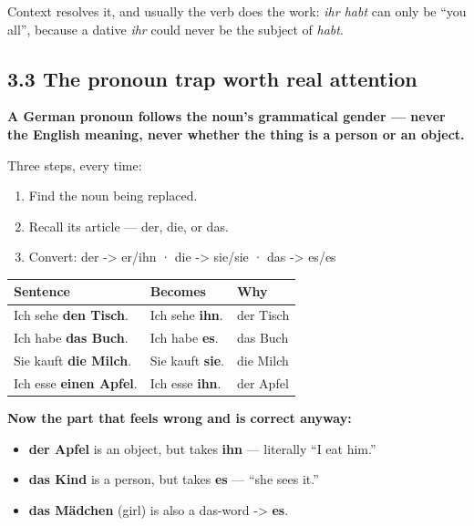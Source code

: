 \documentclass[
  11pt,
]{article}
\newcounter{none} %
\providecommand{\tightlist}{%
  \setlength{\itemsep}{0pt}\setlength{\parskip}{0pt}}
\begin{document}
Context resolves it, and usually the verb does the work: \emph{ihr habt}
can only be ``you all'', because a dative \emph{ihr} could never be the
subject of \emph{habt}.

\subsection{3.3 The pronoun trap worth real
attention}\label{the-pronoun-trap-worth-real-attention}

\textbf{A German pronoun follows the noun's grammatical gender --- never
the English meaning, never whether the thing is a person or an object.}

Three steps, every time:

\begin{enumerate}
\def\labelenumi{\arabic{enumi}.}
\tightlist
\item
  Find the noun being replaced.
\item
  Recall its article --- der, die, or das.
\item
  Convert: der -\textgreater{} er/ihn · die -\textgreater{} sie/sie ·
  das -\textgreater{} es/es
\end{enumerate}

{\def\LTcaptype{none} %
\begin{longtable}[]{@{}lll@{}}
\toprule\noalign{}
Sentence & Becomes & Why \\
\midrule\noalign{}
\endhead
\bottomrule\noalign{}
\endlastfoot
Ich sehe \textbf{den Tisch}. & Ich sehe \textbf{ihn}. & der Tisch \\
Ich habe \textbf{das Buch}. & Ich habe \textbf{es}. & das Buch \\
Sie kauft \textbf{die Milch}. & Sie kauft \textbf{sie}. & die Milch \\
Ich esse \textbf{einen Apfel}. & Ich esse \textbf{ihn}. & der Apfel \\
\end{longtable}
}

\textbf{Now the part that feels wrong and is correct anyway:}

\begin{itemize}
\tightlist
\item
  \textbf{der Apfel} is an object, but takes \textbf{ihn} --- literally
  ``I eat him.''
\item
  \textbf{das Kind} is a person, but takes \textbf{es} --- ``she sees
  it.''
\item
  \textbf{das Mädchen} (girl) is also a das-word -\textgreater{}
  \textbf{es}.
\end{itemize}
\end{document}
